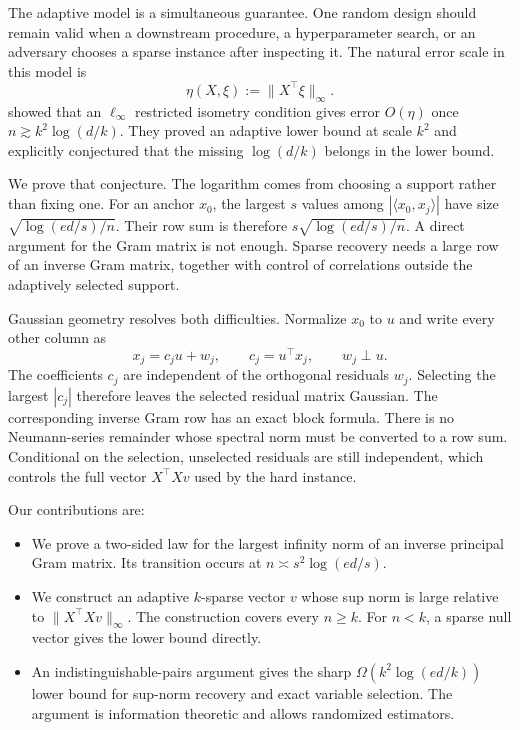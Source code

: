 \documentclass[twoside]{article}
\begin{document}
The adaptive model is a simultaneous guarantee. One random design should remain
valid when a downstream procedure, a hyperparameter search, or an adversary
chooses a sparse instance after inspecting it. The natural error scale in this
model is
\[
 \eta(X,\xi):=\|X^\top\xi\|_\infty.
\]
\citet{chen2026adaptive} showed that an $\ell_\infty$ restricted isometry
condition gives error $O(\eta)$ once
$n\gtrsim k^2\log(d/k)$. They proved an adaptive lower bound at scale $k^2$ and
explicitly conjectured that the missing $\log(d/k)$ belongs in the lower bound.

We prove that conjecture. The logarithm comes from choosing a support rather than
fixing one. For an anchor $x_0$, the largest $s$ values among
$|\langle x_0,x_j\rangle|$ have size
$\sqrt{\log(ed/s)/n}$. Their row sum is therefore
$s\sqrt{\log(ed/s)/n}$. A direct argument for the Gram matrix is not enough.
Sparse recovery needs a large row of an inverse Gram matrix, together with
control of correlations outside the adaptively selected support.

Gaussian geometry resolves both difficulties. Normalize $x_0$ to $u$ and write
every other column as
\[
 x_j=c_j u+w_j,
 \qquad c_j=u^\top x_j,
 \qquad w_j\perp u.
\]
The coefficients $c_j$ are independent of the orthogonal residuals $w_j$.
Selecting the largest $|c_j|$ therefore leaves the selected residual matrix
Gaussian. The corresponding inverse Gram row has an exact block formula. There
is no Neumann-series remainder whose spectral norm must be converted to a row
sum. Conditional on the selection, unselected residuals are still independent,
which controls the full vector $X^\top Xv$ used by the hard instance.

Our contributions are:
\begin{itemize}
\item We prove a two-sided law for the largest infinity norm of an inverse
principal Gram matrix. Its transition occurs at
$n\asymp s^2\log(ed/s)$.
\item We construct an adaptive $k$-sparse vector $v$ whose sup norm is large
relative to $\|X^\top Xv\|_\infty$. The construction covers every $n\geq k$.
For $n<k$, a sparse null vector gives the lower bound directly.
\item An indistinguishable-pairs argument gives the sharp
$\Omega(k^2\log(ed/k))$ lower bound for sup-norm recovery and exact variable
selection. The argument is information theoretic and allows randomized
estimators.
\end{itemize}
\end{document}
